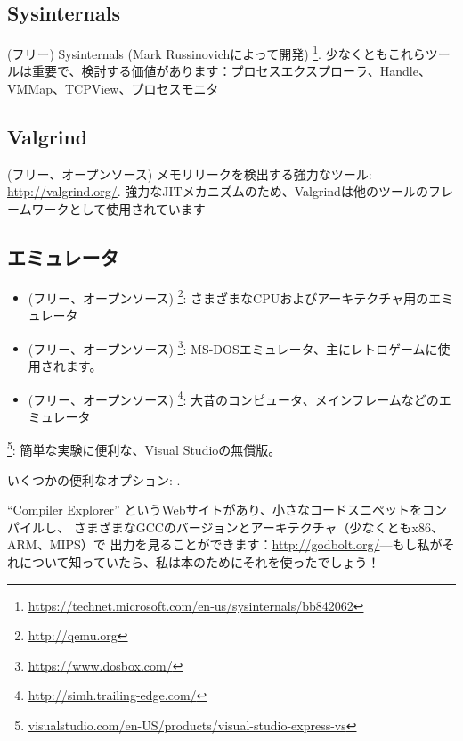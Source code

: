 \subsection{Sysinternals}

(フリー) Sysinternals (Mark Russinovichによって開発)
\footnote{\url{https://technet.microsoft.com/en-us/sysinternals/bb842062}}.
少なくともこれらツールは重要で、検討する価値があります：プロセスエクスプローラ、Handle、VMMap、TCPView、プロセスモニタ

\subsection{Valgrind}

(フリー、オープンソース) メモリリークを検出する強力なツール: \url{http://valgrind.org/}.
強力な\ac{JIT}メカニズムのため、Valgrindは他のツールのフレームワークとして使用されています


\subsection{エミュレータ}

\begin{itemize}
\item (フリー、オープンソース) \footnote{\url{http://qemu.org}}: さまざまなCPUおよびアーキテクチャ用のエミュレータ

\item (フリー、オープンソース) \footnote{\url{https://www.dosbox.com/}}: MS-DOSエミュレータ、主にレトロゲームに使用されます。

\item (フリー、オープンソース) \footnote{\url{http://simh.trailing-edge.com/}}: 大昔のコンピュータ、メインフレームなどのエミュレータ
\end{itemize}


\footnote{\href{http://go.yurichev.com/17034}{visualstudio.com/en-US/products/visual-studio-express-vs}}:
簡単な実験に便利な、Visual Studioの無償版。

いくつかの便利なオプション: .

``Compiler Explorer'' というWebサイトがあり、小さなコードスニペットをコンパイルし、
さまざまなGCCのバージョンとアーキテクチャ（少なくともx86、ARM、MIPS）で
出力を見ることができます：\url{http://godbolt.org/}---もし私がそれについて知っていたら、私は本のためにそれを使ったでしょう！


